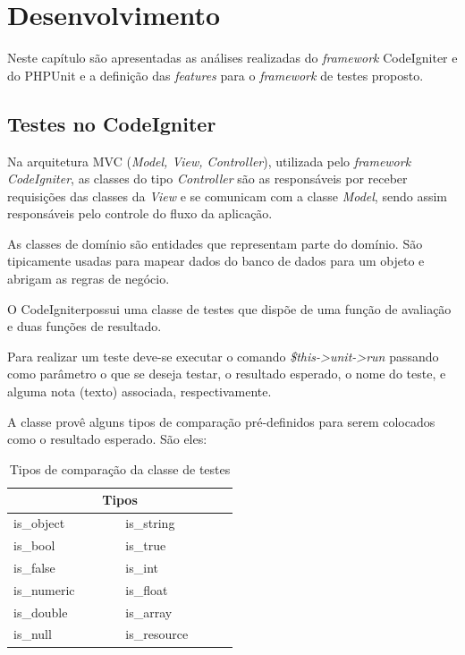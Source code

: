 \chapter{Desenvolvimento}

Neste capítulo são apresentadas as análises realizadas do \textit{framework} CodeIgniter e do PHPUnit e a definição das \textit{features} para o \textit{framework} de testes proposto.

    
\section{Testes no CodeIgniter}

Na arquitetura MVC (\textit{Model, View, Controller}), utilizada pelo \textit{framework} \textit{CodeIgniter}, as classes do tipo \textit{Controller} são as responsáveis por receber requisições das classes da \textit{View} e se comunicam com a classe \textit{Model}, sendo assim responsáveis pelo controle do fluxo da aplicação.

As classes de domínio são entidades que representam parte do domínio. São tipicamente usadas para mapear dados do banco de dados para um objeto e abrigam as regras de negócio.

O CodeIgniter\footnotemark possui uma classe de testes que dispõe de uma função de avaliação
e duas funções de resultado. 

Para realizar um teste deve-se executar o comando \textit{\$this->unit->run} passando como parâmetro
o que se deseja testar, o resultado esperado, o nome do teste, e alguma nota (texto) associada, respectivamente.

A classe provê alguns tipos de comparação pré-definidos para serem colocados como o resultado esperado. São eles:

\begin{table}[!h]
\caption{Tipos de comparação da classe de testes}
\label{table:tipos_comparacao}
\centering
\begin{tabular}{|p{0.25\linewidth}|p{0.25\linewidth}|}
  \hline
  \multicolumn{2}{|c|}{\textbf{Tipos}} \\
  \hline			
	is\_object & is\_string \\
  \hline
	is\_bool &	is\_true \\
  \hline
	is\_false & is\_int \\
  \hline
	is\_numeric & is\_float \\
  \hline
	is\_double & is\_array \\
  \hline
	is\_null &	is\_resource \\
  \hline
  \end{tabular}
\end{table}

